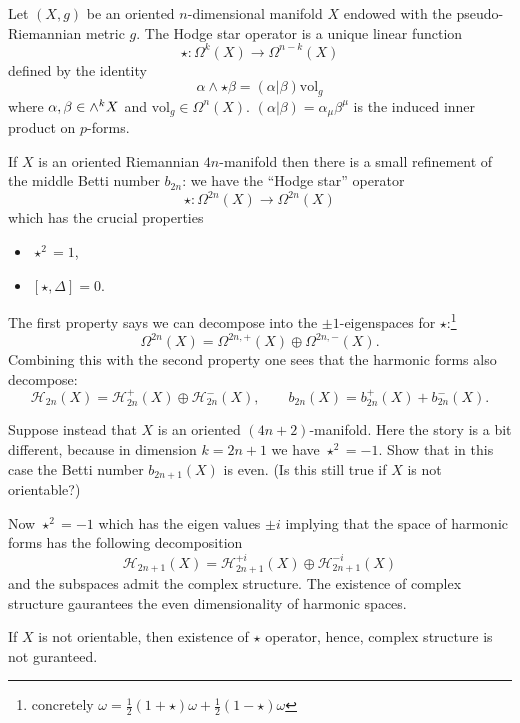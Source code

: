 \documentclass[12pt,letterpaper,reqno]{article}
\numberwithin{equation}{section}
\newcommand{\cH}{\ensuremath{\mathcal H}}
\newcommand{\half}{\ensuremath{\frac{1}{2}}}
\begin{document}
Let $(X,g)$ be an oriented $n$-dimensional manifold $X$ endowed with the pseudo-Riemannian metric $g$.  The Hodge star operator is a unique linear function 
\begin{equation}
  \star:\Omega^k(X)\to\Omega^{n-k}(X)
\end{equation}
defined by the identity
\begin{equation}
  \alpha\wedge\star\beta=(\alpha|\beta)\text{vol}_{g}
\end{equation}
where $\alpha,\beta\in\large{\wedge}^kX$ and $\text{vol}_{g}\in\Omega^n(X)$.  $(\alpha|\beta)=\alpha_\mu\beta^\mu$ is the induced inner product on $p$-forms.

If $X$ is an oriented Riemannian $4n$-manifold then there is a small refinement of the
middle Betti number $b_{2n}$:
we have the ``Hodge star'' operator
\begin{equation}
  \star: \Omega^{2n}(X) \to \Omega^{2n}(X)
\end{equation}
which has the crucial properties
\begin{itemize}
  \item $\star^2 = 1$,
  \item $[\star, \Delta] = 0$.
\end{itemize}
The first property says we can decompose into the $\pm 1$-eigenspaces
for $\star$:\footnote{concretely $\omega = \half(1 + \star) \omega + \half(1 - \star) \omega $}
\begin{equation}
  \Omega^{2n}(X) = \Omega^{2n,+}(X) \oplus \Omega^{2n,-}(X).
\end{equation}
Combining this with the second property one sees that the harmonic forms also decompose:
\begin{equation}
  \cH_{2n}(X) = \cH_{2n}^+(X) \oplus \cH_{2n}^-(X), \qquad b_{2n}(X) = b_{2n}^+(X) + b_{2n}^-(X).
\end{equation}

\begin{exercise} Suppose instead that $X$ is an oriented  $(4n+2)$-manifold. Here the story is a bit different, because in dimension $k = 2n+1$
we have $\star^2 = -1$.
Show that in this case the Betti number $b_{2n+1}(X)$ is even.
(Is this still true if $X$ is not orientable?)
\end{exercise}

\begin{solution}
  Now $\star^2=-1$ which has the eigen values $\pm i$ implying that the space of harmonic forms has the following decomposition
  \begin{equation}
    \cH_{2n+1}(X)=\cH_{2n+1}^{+i}(X) \oplus \cH_{2n+1}^{-i}(X)
  \end{equation}
and the subspaces admit the complex structure.  The existence of complex structure gaurantees the even dimensionality of harmonic spaces.

If $X$ is not orientable, then existence of $\star$ operator, hence, complex structure is not guranteed.
\end{solution}
\end{document}
